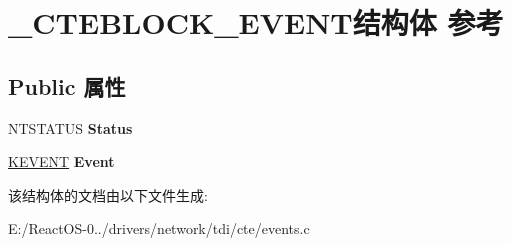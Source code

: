 \hypertarget{struct___c_t_e_b_l_o_c_k___e_v_e_n_t}{}\section{\+\_\+\+C\+T\+E\+B\+L\+O\+C\+K\+\_\+\+E\+V\+E\+N\+T结构体 参考}
\label{struct___c_t_e_b_l_o_c_k___e_v_e_n_t}
\subsection*{Public 属性}
\begin{DoxyCompactItemize}
\item 
\mbox{\label{struct___c_t_e_b_l_o_c_k___e_v_e_n_t_ae183b8c2b3f317dbd07f25cf587c2514}} 
N\+T\+S\+T\+A\+T\+US {\bfseries Status}
\item 
\mbox{\label{struct___c_t_e_b_l_o_c_k___e_v_e_n_t_a9fb7eabf830813c202f2bc721e17ea90}} 
\hyperlink{struct___k_e_v_e_n_t}{K\+E\+V\+E\+NT} {\bfseries Event}
\end{DoxyCompactItemize}


该结构体的文档由以下文件生成\+:\begin{DoxyCompactItemize}
\item 
E\+:/\+React\+O\+S-\/0../drivers/network/tdi/cte/events.\+c\end{DoxyCompactItemize}
